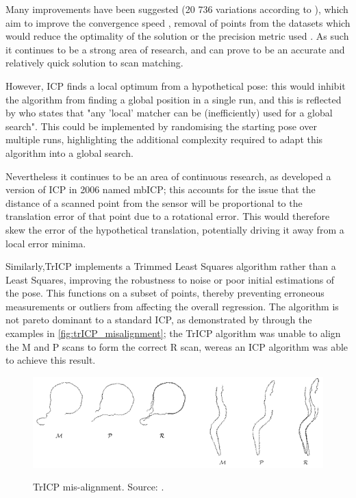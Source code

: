 \documentclass[authoryearcitations]{UoYCSproject}
\begin{document}
Many improvements have been suggested (20 736 variations according to \citet{Donoso2017-wp}), which aim to improve the convergence speed \cite{Donoso2017-wp} \cite{Simon1996-dl}, removal of points from the datasets which would reduce the optimality of the solution \cite{Weik1997-px} \cite{Masuda1996-av} or the precision metric used \cite{Eggert1997-ak}. As such it continues to be a strong area of research, and can prove to be an accurate and relatively quick solution to scan matching.

However, ICP finds a local optimum from a hypothetical pose: this would inhibit the algorithm from finding a global position in a single run, and this is reflected by \citet{Censi2005-iv} who states that "any 'local' matcher can be (inefficiently) used for a global search". This could be implemented by randomising the starting pose over multiple runs, highlighting the additional complexity required to adapt this algorithm into a global search.

Nevertheless it continues to be an area of continuous research, as \citet{Minguez2006-nj} developed a version of ICP in 2006 named mbICP;  this accounts for the issue that the distance of a scanned point from the sensor will be proportional to the translation error of that point due to a rotational error. This would therefore skew the error of the hypothetical translation, potentially driving it away from a local error minima.

Similarly,TrICP \cite{Chetverikov2005-yz} implements a Trimmed Least Squares \cite{Ruppert1980-js} algorithm rather than a Least Squares, improving the robustness to noise or poor initial estimations of the pose. This functions on a subset of points, thereby preventing erroneous measurements or outliers from affecting the overall regression. The algorithm is not pareto dominant to a standard ICP, as demonstrated by \citeauthor{Chetverikov2005-yz} through the examples in \autoref{fig:trICP_misalignment}; the TrICP algorithm was unable to align the M and P scans to form the correct R scan, wereas an ICP algorithm was able to achieve this result. 


\begin{figure}[t]
	\centering
	\includegraphics[width=\textwidth,keepaspectratio]{images/trICP_misalignment.png}
	\label{fig:trICP_misalignment}
	\caption{TrICP mis-alignment. Source: \citet{Chetverikov2005-yz}.}
\end{figure}
\end{document}
